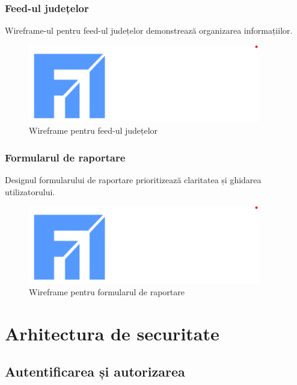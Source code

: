 \documentclass[12pt,a4paper]{report}
\begin{document}
\subsubsection{Feed-ul județelor}

Wireframe-ul pentru feed-ul județelor demonstrează organizarea informațiilor.

\begin{figure}[H]
\centering
\includegraphics[width=0.9\textwidth]{logo_uaic.png}
\caption{Wireframe pentru feed-ul județelor}
\label{fig:wireframe_feed}
\end{figure}

\subsubsection{Formularul de raportare}

Designul formularului de raportare prioritizează claritatea și ghidarea utilizatorului.

\begin{figure}[H]
\centering
\includegraphics[width=0.9\textwidth]{logo_uaic.png}
\caption{Wireframe pentru formularul de raportare}
\label{fig:wireframe_form}
\end{figure}

\section{Arhitectura de securitate}

\subsection{Autentificarea și autorizarea}
\end{document}
